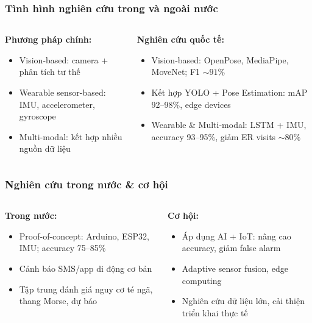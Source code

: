 \begin{frame}
    \frametitle{Tình hình nghiên cứu trong và ngoài nước}
    \begin{columns}[T]
        \begin{column}{0.5\textwidth}
            \textbf{Phương pháp chính:}
            \begin{itemize}
                \item Vision-based: camera + phân tích tư thế
                \item Wearable sensor-based: IMU, accelerometer, gyroscope
                \item Multi-modal: kết hợp nhiều nguồn dữ liệu
            \end{itemize}
        \end{column}
        \begin{column}{0.5\textwidth}
            \textbf{Nghiên cứu quốc tế:}
            \begin{itemize}
                \item Vision-based: OpenPose, MediaPipe, MoveNet; F1 $\sim 91\%$
                \item Kết hợp YOLO + Pose Estimation: mAP 92--98\%, edge devices
                \item Wearable \& Multi-modal: LSTM + IMU, accuracy 93--95\%, giảm ER visits $\sim 80\%$
            \end{itemize}
        \end{column}
    \end{columns}
\end{frame}

\begin{frame}
    \frametitle{Nghiên cứu trong nước \& cơ hội}
    \begin{columns}[T]
        \begin{column}{0.5\textwidth}
            \textbf{Trong nước:}
            \begin{itemize}
                \item Proof-of-concept: Arduino, ESP32, IMU; accuracy 75--85\%
                \item Cảnh báo SMS/app di động cơ bản
                \item Tập trung đánh giá nguy cơ té ngã, thang Morse, dự báo
            \end{itemize}
        \end{column}
        \begin{column}{0.5\textwidth}
            \textbf{Cơ hội:}
            \begin{itemize}
                \item Áp dụng AI + IoT: nâng cao accuracy, giảm false alarm
                \item Adaptive sensor fusion, edge computing
                \item Nghiên cứu dữ liệu lớn, cải thiện triển khai thực tế
            \end{itemize}
        \end{column}
    \end{columns}
\end{frame}


